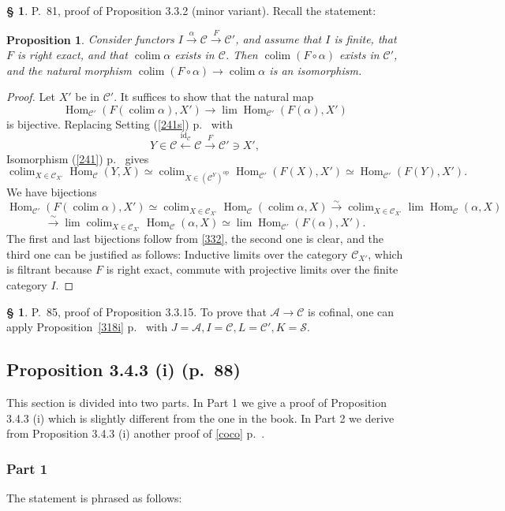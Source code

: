 \documentclass[12pt]{article}
\newtheorem{prop}[thm]{Proposition}
\theoremstyle{remark}
\theoremstyle{definition}
\newtheorem{s}[thm]{\S}
\newcommand{\cc}{\mathcal}
\newcommand{\A}{\mathcal A}
\newcommand{\C}{\mathcal C}
\newcommand{\mv}{ (minor variant)}
\newcommand{\xr}{\xrightarrow}
\DeclareMathOperator*{\co}{colim}
\DeclareMathOperator{\id}{id}
\DeclareMathOperator{\Hom}{Hom}%
\DeclareMathOperator{\op}{op}
\begin{document}
%
%
\begin{s} P.~81, proof of Proposition 3.3.2\mv. Recall the statement:
%
\begin{prop} 
%
Consider functors $I\xrightarrow\alpha\C\xrightarrow F\C'$, and assume that $I$ is finite, that $F$ is right exact, and that $\co\alpha$ exists in $\C$. Then $\co(F\circ\alpha)$ exists in $\C'$, and the natural morphism $\co(F\circ\alpha)\to\co\alpha$ is an isomorphism. 
%
\end{prop} 
%
\begin{proof}
Let $X'$ be in $\C'$. It suffices to show that the natural map 
$$
\Hom_{\C'}(F(\co\alpha),X')\to\lim\Hom_{\C'}(F(\alpha),X')
$$ 
%
is bijective. Replacing Setting (\ref{241s}) p.~\pageref{241s} with 
$$
Y\in\C\xleftarrow{\id_\C}\C\xrightarrow{F}\C'\ni X', 
$$ 
Isomorphism (\ref{241}) p.~\pageref{241} gives 
%
\begin{equation}\label{332} 
\co_{X\in\C_{X'}}\Hom_\C(Y,X)\simeq\co_{X\in(\C^Y)^{\op}}\Hom_{\C'}(F(X),X')\simeq\Hom_{\C'}(F(Y),X').
\end{equation} 
%
We have bijections 
$$ 
\Hom_{\C'}(F(\co\alpha),X')\simeq\co_{X\in\C_{X'}}\Hom_\C(\co\alpha,X)\xr\sim\co_{X\in\C_{X'}}\lim\Hom_\C(\alpha,X) 
$$ 
$$
\xr\sim\lim\co_{X\in\C_{X'}}\Hom_\C(\alpha,X)\simeq\lim\Hom_{\C'}(F(\alpha),X'). 
$$ 
The first and last bijections follow from \eqref{332}, the second one is clear, and the third one can be justified as follows: Inductive limits over the category $\C_{X'}$, which is filtrant because $F$ is right exact, commute with projective limits over the finite category $I$.
\end{proof}
\end{s}
%
%
\begin{s}\label{3315}
P.~85, proof of Proposition 3.3.15. To prove that $\A\to\C$ is cofinal, one can apply Proposition~\ref{318i} p.~\pageref{318i} with $J=\A,I=\C,L=\C',K=\cc S$. 
\end{s}
%
%
\subsection{Proposition 3.4.3 (i) (p.~88)}
%
This section is divided into two parts. In Part 1 we give a proof of Proposition 3.4.3 (i) which is slightly different from the one in the book. In Part 2 we derive from Proposition 3.4.3 (i) another proof of \eqref{coco} p.~\pageref{coco}. 
%
\subsubsection{Part 1} 
%
The statement is phrased as follows: 
\end{document}
